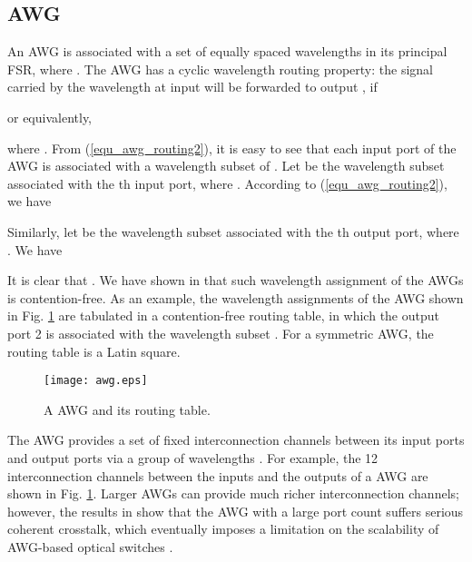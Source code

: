 \documentclass[journal]{IEEEtran}
\begin{document}
\subsection{AWG}
An  AWG is associated with a set of equally spaced
wavelengths  in
its principal FSR, where . The AWG has a
cyclic wavelength routing property: the signal carried by the
wavelength  at input  will be forwarded to
output , if

or equivalently,

where . From
(\ref{equ_awg_routing2}), it is easy to see that each input port of
the AWG is associated with a wavelength subset of . Let
 be the wavelength subset associated with the th input
port, where . According to
(\ref{equ_awg_routing2}), we have

Similarly, let  be the wavelength subset associated with
the th output port, where . We have

It is clear that
. We have shown in \cite{Ye:JLT2012} that such wavelength
assignment of the AWGs is contention-free. As an example, the
wavelength assignments of the  AWG shown in Fig.
\ref{f_awg} are tabulated in a contention-free routing table, in
which the output port 2 is associated with the wavelength subset
. For a symmetric AWG,
the routing table is a Latin square.

\begin{figure}[t]
\centering
\texttt{[image: awg.eps]}
\caption{A  AWG and its routing table.}\label{f_awg}
\end{figure}

The  AWG provides a set of  fixed interconnection
channels between its input ports and output ports via a group of
 wavelengths \cite{Ye:JLT2012}. For example, the 12
interconnection channels between the inputs and the outputs of a
 AWG are shown in Fig. \ref{f_awg}. Larger AWGs can
provide much richer interconnection channels; however, the results
in \cite{Gaudino:ICC2008} show that the AWG with a large port count
suffers serious coherent crosstalk, which eventually imposes a
limitation on the scalability of AWG-based optical switches
\cite{Bianco:TON}.
\end{document}
